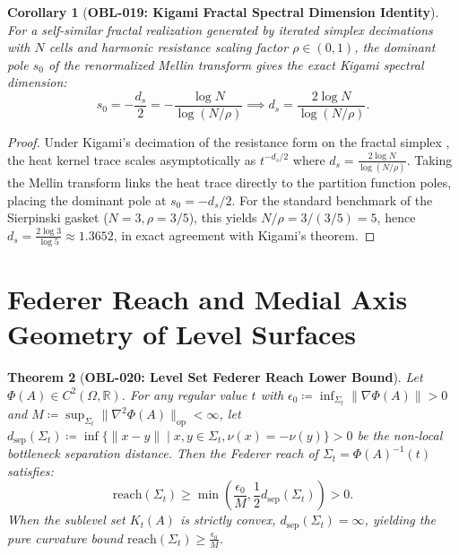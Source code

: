 \documentclass[11pt,a4paper,reqno]{amsart}
\newtheorem{theorem}{Theorem}[section]
\newtheorem{corollary}[theorem]{Corollary}
\theoremstyle{definition}
\theoremstyle{remark}
\numberwithin{equation}{section}
\begin{document}
\begin{corollary}[\textbf{OBL-019: Kigami Fractal Spectral Dimension Identity}]
\label{cor:kigami_spectral_dim}
For a self-similar fractal realization generated by iterated simplex decimations with $N$ cells and harmonic resistance scaling factor $\rho \in (0, 1)$, the dominant pole $s_0$ of the renormalized Mellin transform gives the exact Kigami spectral dimension:
\begin{equation}
s_0 = -\frac{d_s}{2} = -\frac{\log N}{\log(N / \rho)} \implies d_s = \frac{2 \log N}{\log(N / \rho)}.
\end{equation}
\end{corollary}

\begin{proof}
Under Kigami's decimation of the resistance form on the fractal simplex \cite{Kigami2001}, the heat kernel trace scales asymptotically as $t^{-d_s/2}$ where $d_s = \frac{2\log N}{\log(N/\rho)}$. Taking the Mellin transform links the heat trace directly to the partition function poles, placing the dominant pole at $s_0 = -d_s/2$. For the standard benchmark of the Sierpinski gasket ($N=3, \rho = 3/5$), this yields $N/\rho = 3/(3/5) = 5$, hence $d_s = \frac{2\log 3}{\log 5} \approx 1.3652$, in exact agreement with Kigami's theorem.
\end{proof}

\section{Federer Reach and Medial Axis Geometry of Level Surfaces}
\label{sec:federer}

\begin{theorem}[\textbf{OBL-020: Level Set Federer Reach Lower Bound}]
\label{thm:federer_reach_bound}
Let $\Phi(A) \in C^2(\Omega, \mathbb{R})$. For any regular value $t$ with $\epsilon_0 \coloneqq \inf_{\Sigma_t} \|\nabla \Phi(A)\| > 0$ and $M \coloneqq \sup_{\Sigma_t} \|\nabla^2 \Phi(A)\|_{\mathrm{op}} < \infty$, let $d_{\mathrm{sep}}(\Sigma_t) \coloneqq \inf \{ \|x - y\| \mid x, y \in \Sigma_t, \nu(x) = -\nu(y) \} > 0$ be the non-local bottleneck separation distance. Then the Federer reach of $\Sigma_t = \Phi(A)^{-1}(t)$ satisfies:
\begin{equation}
\mathrm{reach}(\Sigma_t) \ge \min\left( \frac{\epsilon_0}{M}, \frac{1}{2} d_{\mathrm{sep}}(\Sigma_t) \right) > 0.
\end{equation}
When the sublevel set $K_t(A)$ is strictly convex, $d_{\mathrm{sep}}(\Sigma_t) = \infty$, yielding the pure curvature bound $\mathrm{reach}(\Sigma_t) \ge \frac{\epsilon_0}{M}$.
\end{theorem}
\end{document}
